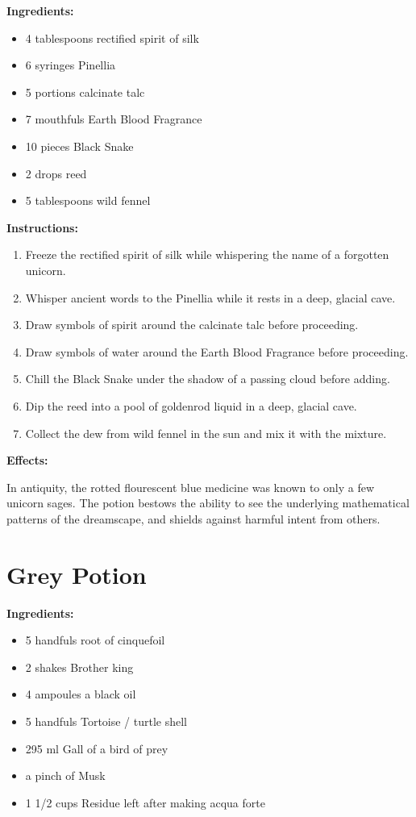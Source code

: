\documentclass{article}
\begin{document}
\textbf{Ingredients:}

\begin{itemize}
  \item 4 tablespoons rectified spirit of silk
  \item 6 syringes Pinellia
  \item 5 portions calcinate talc
  \item 7 mouthfuls Earth Blood Fragrance
  \item 10 pieces Black Snake
  \item 2 drops reed
  \item 5 tablespoons wild fennel
\end{itemize}

\textbf{Instructions:}

\begin{enumerate}
  \item Freeze the rectified spirit of silk while whispering the name of a forgotten unicorn.
  \item Whisper ancient words to the Pinellia while it rests in a deep, glacial cave.
  \item Draw symbols of spirit around the calcinate talc before proceeding.
  \item Draw symbols of water around the Earth Blood Fragrance before proceeding.
  \item Chill the Black Snake under the shadow of a passing cloud before adding.
  \item Dip the reed into a pool of goldenrod liquid in a deep, glacial cave.
  \item Collect the dew from wild fennel in the sun and mix it with the mixture.
\end{enumerate}

\textbf{Effects:}

In antiquity, the rotted flourescent blue medicine was known to only a few unicorn sages. The potion bestows the ability to see the underlying mathematical patterns of the dreamscape, and shields against harmful intent from others.

\newpage
\section*{Grey Potion}

\textbf{Ingredients:}

\begin{itemize}
  \item 5 handfuls root of cinquefoil
  \item 2 shakes Brother king
  \item 4 ampoules a black oil
  \item 5 handfuls Tortoise / turtle   shell
  \item 295 ml Gall of a bird of prey
  \item a pinch of Musk
  \item 1 1/2 cups Residue left after making acqua forte
\end{itemize}
\end{document}
